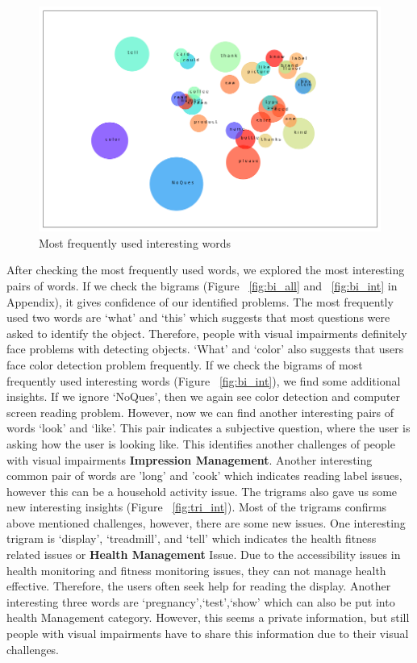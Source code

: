 \documentclass[sigconf]{acmart}
\begin{document}
\begin{figure}[hbp]
        \centering
        
        \includegraphics[width=\columnwidth]{images/int_count.png}  
        \caption{Most frequently used interesting words} 
          \label{fig:uni_int}   
      
        
\end{figure}

After checking the most frequently used words, we explored the most interesting pairs of words. If we check the bigrams (Figure ~\ref{fig:bi_all} and ~\ref{fig:bi_int} in Appendix), it gives confidence of our identified problems. The most frequently used two words are `what' and `this' which suggests that most questions were asked to identify the object. Therefore, people with visual impairments definitely face problems with detecting objects. `What' and `color' also suggests that users face color detection problem frequently. If we check the bigrams of most frequently used interesting words (Figure ~\ref{fig:bi_int}), we find some additional insights. If we ignore `NoQues', then we again see color detection and computer screen reading problem. However, now we can find another interesting pairs of words `look' and `like'. This pair indicates a subjective question, where the user is asking how the user is looking like. This identifies another challenges of people with visual impairments \textbf{Impression Management}. Another interesting common pair of words are 'long' and 'cook' which indicates reading label issues, however this can be a household activity issue. The trigrams also gave us some new interesting insights (Figure ~\ref{fig:tri_int}). Most of the trigrams confirms above mentioned challenges, however, there are some new issues. One interesting trigram is `display', `treadmill', and `tell' which indicates the health fitness related issues or \textbf{Health Management} Issue. Due to the accessibility issues in health monitoring and fitness monitoring issues, they can not manage health effective. Therefore, the users often seek help for reading the display. Another interesting three words are `pregnancy',`test',`show' which can also be put into health Management category. However, this seems a private information, but still people with visual impairments have to share this information due to their visual challenges.
\end{document}
